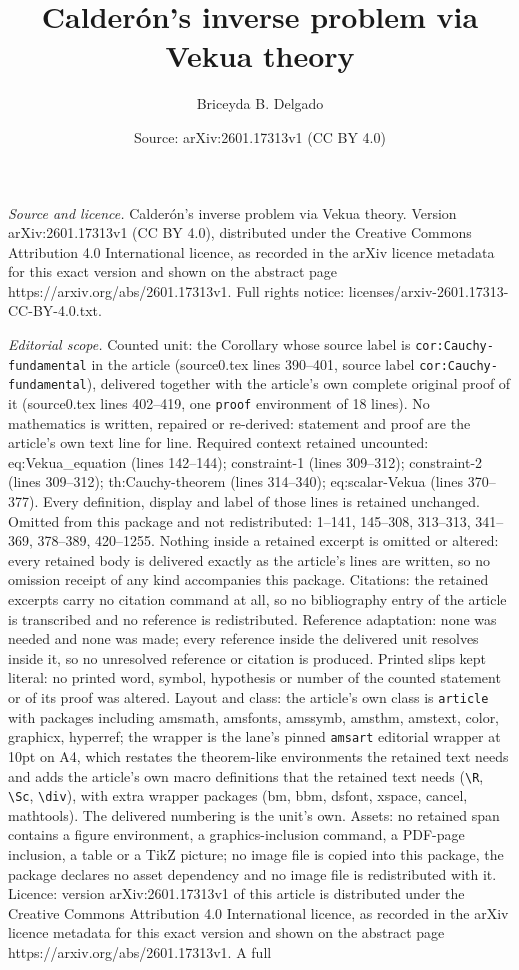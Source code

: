 \documentclass[10pt,a4paper]{amsart}
\title[Calder\'on's inverse problem via Vekua theory]{Calder\'on's inverse problem via Vekua theory}
\author{Briceyda B. Delgado}
\date{Source: arXiv:2601.17313v1 (CC BY 4.0)}
\begin{document}
\maketitle

\noindent\emph{Source and licence.} Calder\'on's inverse problem via Vekua theory. Version arXiv:2601.17313v1 (CC BY 4.0), distributed under the Creative Commons Attribution 4.0 International licence, as recorded in the arXiv licence metadata for this exact version and shown on the abstract page https://arxiv.org/abs/2601.17313v1. Full rights notice: licenses/arxiv-2601.17313-CC-BY-4.0.txt.\par\smallskip

\noindent\textit{Editorial scope.} Counted unit: the Corollary whose source label is \texttt{cor:Cauchy-fundamental} in the article (source0.tex lines 390--401, source label \texttt{cor:Cauchy-fundamental}), delivered together with the article's own complete original proof of it (source0.tex lines 402--419, one \texttt{proof} environment of 18 lines). No mathematics is written, repaired or re-derived: statement and proof are the article's own text line for line. Required context retained uncounted: eq:Vekua\_equation (lines 142--144); constraint-1 (lines 309--312); constraint-2 (lines 309--312); th:Cauchy-theorem (lines 314--340); eq:scalar-Vekua (lines 370--377). Every definition, display and label of those lines is retained unchanged. Omitted from this package and not redistributed: 1--141, 145--308, 313--313, 341--369, 378--389, 420--1255. Nothing inside a retained excerpt is omitted or altered: every retained body is delivered exactly as the article's lines are written, so no omission receipt of any kind accompanies this package. Citations: the retained excerpts carry no citation command at all, so no bibliography entry of the article is transcribed and no reference is redistributed. Reference adaptation: none was needed and none was made; every reference inside the delivered unit resolves inside it, so no unresolved reference or citation is produced. Printed slips kept literal: no printed word, symbol, hypothesis or number of the counted statement or of its proof was altered. Layout and class: the article's own class is \texttt{article} with packages including amsmath, amsfonts, amssymb, amsthm, amstext, color, graphicx, hyperref; the wrapper is the lane's pinned \texttt{amsart} editorial wrapper at 10pt on A4, which restates the theorem-like environments the retained text needs and adds the article's own macro definitions that the retained text needs (\texttt{\textbackslash R}, \texttt{\textbackslash Sc}, \texttt{\textbackslash div}), with extra wrapper packages (bm, bbm, dsfont, xspace, cancel, mathtools). The delivered numbering is the unit's own. Assets: no retained span contains a figure environment, a graphics-inclusion command, a PDF-page inclusion, a table or a TikZ picture; no image file is copied into this package, the package declares no asset dependency and no image file is redistributed with it. Licence: version arXiv:2601.17313v1 of this article is distributed under the Creative Commons Attribution 4.0 International licence, as recorded in the arXiv licence metadata for this exact version and shown on the abstract page https://arxiv.org/abs/2601.17313v1. A full 
\end{document}
